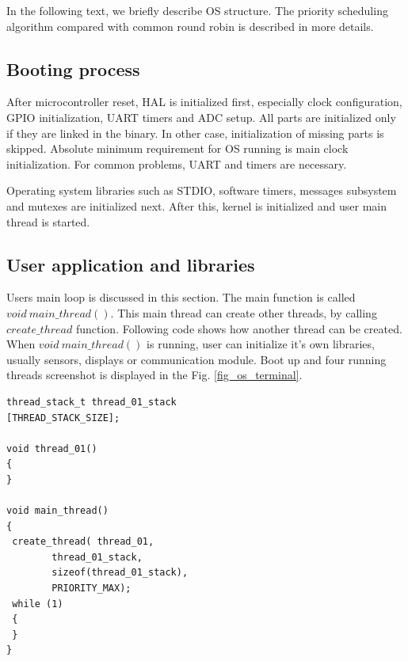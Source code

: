 \documentclass[a4paper, conference]{IEEEtran}
\begin{document}
In the following text, we briefly describe OS structure. The priority scheduling algorithm compared with common round robin is described in more details.

\subsection{Booting process}

After microcontroller reset, HAL is initialized first, especially clock configuration, GPIO initialization, UART timers and ADC setup.
All parts are initialized only if they are linked in the binary. In other case, initialization of missing parts is skipped.
Absolute minimum requirement for OS running is main clock initialization. For common problems, UART and timers are necessary.

Operating system libraries such as STDIO, software timers, messages subsystem and mutexes are initialized next.
After this, kernel is initialized and user main thread is started.

\subsection{User application and libraries}

Users main loop is discussed in this section. The main function is called $void\ main\_thread()$. This main thread can create other threads, by calling $create\_thread$ function. Following code shows how another thread can be created. When $void\ main\_thread()$ is running, user can initialize it's own libraries, usually sensors, displays or communication module. Boot up and four running threads screenshot is displayed in  the Fig. \ref{fig_os_terminal}.

\noindent\begin{minipage}{.45\textwidth}
\lstset{language=C++}
\begin{lstlisting}[frame=single, caption = Thread creating]
thread_stack_t thread_01_stack
[THREAD_STACK_SIZE];

void thread_01()
{
}

void main_thread()
{
 create_thread(	thread_01,
		thread_01_stack,
		sizeof(thread_01_stack),
		PRIORITY_MAX);
 while (1)
 {
 }
}
\end{lstlisting}
\end{minipage}\hfill
\end{document}
